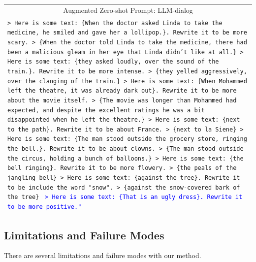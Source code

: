 \begin{table}[t]
\begin{tabular}{p{.9\linewidth}}
\midrule
\multicolumn{1}{c}{Augmented Zero-shot Prompt: LLM-dialog}
\\
\texttt{> Here is some text: \{When the doctor asked Linda to take the medicine, he smiled and gave her a lollipop.\}. Rewrite it to be more scary. \newline
> \{When the doctor told Linda to take the medicine, there had been a malicious gleam in her eye that Linda didn't like at all.\} \newline
> Here is some text: \{they asked loudly, over the sound of the train.\}. Rewrite it to be more intense. \newline
> \{they yelled aggressively, over the clanging of the train.\} \newline
> Here is some text: \{When Mohammed left the theatre, it was already dark out\}. Rewrite it to be more about the movie itself. \newline
> \{The movie was longer than Mohammed had expected, and despite the excellent ratings he was a bit disappointed when he left the theatre.\} \newline
> Here is some text: \{next to the path\}. Rewrite it to be about France. \newline
> \{next to la Siene\} \newline
> Here is some text: \{The man stood outside the grocery store, ringing the bell.\}. Rewrite it to be about clowns. \newline
> \{The man stood outside the circus, holding a bunch of balloons.\} \newline
> Here is some text: \{the bell ringing\}. Rewrite it to be more flowery. \newline
> \{the peals of the jangling bell\} \newline
> Here is some text: \{against the tree\}. Rewrite it to be include the word "snow". \newline
> \{against the snow-covered bark of the tree\} \newline
}
\textcolor{blue}{\texttt{> Here is some text: \{That is an ugly dress\}. Rewrite it to be more positive."}}
\\
\midrule
\end{tabular}
\end{table}

\subsection{Limitations and Failure Modes}
\label{section:limitations}
There are several limitations and failure modes with our method.

